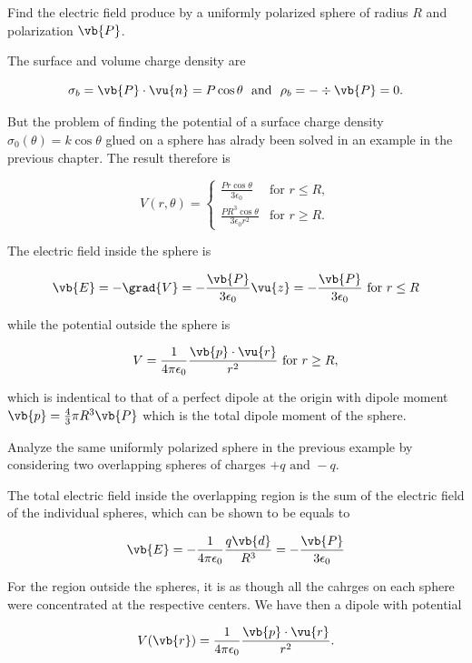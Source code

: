 \documentclass[english,a4paper,12pt]{report}
\begin{document}
{Find the electric field produce by a uniformly polarized sphere of radius \(R\) and polarization \(\vb{P} \).}
{The surface and volume charge density are

\begin{equation}
    \sigma _{b} = \vb{P} \cdot \vu{n} = P\cos \theta  ~\text { and }~ \rho _{b} = - \div{\vb{P} } = 0.  
\end{equation}

But the problem of finding the potential of a surface charge density \(\sigma _{0} (\theta ) = k\cos \theta  \) glued on a sphere has alrady been solved in an example in the previous chapter. The result therefore is

\begin{equation}
 V(r, \theta) =
    \begin{cases}
    \displaystyle \frac{P r \cos\theta}{3 \epsilon_0} & \text{for } r \leq R, \\[10pt]
    \displaystyle \frac{P R^3 \cos\theta}{3 \epsilon_0 r^2} & \text{for } r \geq R.
    \end{cases}  
\end{equation}

The electric field inside the sphere is 

\begin{equation}
    \vb{E} = -\grad{V} = - \frac{\vb{P} }{3\epsilon _{0} }\vu{z} = - \frac{\vb{P} }{3 \epsilon _{0} } \text{ for } r \le R
\end{equation}

while the potential outside the sphere is 

\begin{equation}
    V = \frac{1}{4\pi \epsilon_0} \frac{\vb{p} \cdot \vu{r} }{r^2} \text{ for } r \ge R, 
\end{equation}

which is indentical to that of a perfect dipole at the origin with dipole moment \(\vb{p} = \frac{4}{3}\pi R^3 \vb{P}  \) which is the total dipole moment of the sphere. 
} 

{Analyze the same uniformly polarized sphere in the previous example by considering two overlapping spheres of charges \(+q\text { and } -q\).}
{The total electric field inside the overlapping region is the sum of the electric field of the individual spheres, which can be shown to be equals to

\begin{equation}
    \vb{E} = -\frac{1}{4\pi \epsilon_0} \frac{q\vb{d} }{R^3 } = -\frac{\vb{P} }{3\epsilon _{0} } 
\end{equation}

For the region outside the spheres, it is as though all the cahrges on each sphere were concentrated at the respective centers. We have then a dipole with potential 

\begin{equation}
    V(\vb{r} ) = \frac{1}{4\pi \epsilon_0} \frac{\vb{p} \cdot \vu{r} }{r^2}. 
\end{equation}
} 
\end{document}
